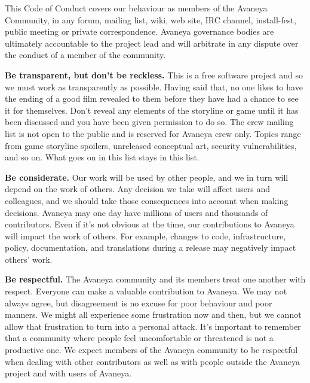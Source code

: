 
\blank
{}
\blank

This Code of Conduct covers our behaviour as members of the Avaneya Community, in any forum, mailing list, wiki, web site, IRC channel, install-fest, public meeting or private correspondence. Avaneya governance bodies are ultimately accountable to the project lead and will arbitrate in any dispute over the conduct of a member of the community.

\startitemize
\item
{\bf Be transparent, but don't be reckless.} This is a free software project and so we must work as transparently as possible. Having said that, no one likes to have the ending of a good film revealed to them before they have had a chance to see it for themselves. Don't reveal any elements of the storyline or game until it has been discussed and you have been given permission to do so. The crew mailing list is not open to the public and is reserved for Avaneya crew only. Topics range from game storyline spoilers, unreleased conceptual art, security vulnerabilities, and so on. What goes on in this list stays in this list.

\item
{\bf Be considerate.} Our work will be used by other people, and we in turn will depend on the work of others. Any decision we take will affect users and colleagues, and we should take those consequences into account when making decisions. Avaneya may one day have millions of users and thousands of contributors. Even if it's not obvious at the time, our contributions to Avaneya will impact the work of others. For example, changes to code, infrastructure, policy, documentation, and translations during a release may negatively impact others' work.

\item
{\bf Be respectful.} The Avaneya community and its members treat one another with respect. Everyone can make a valuable contribution to Avaneya. We may not always agree, but disagreement is no excuse for poor behaviour and poor manners. We might all experience some frustration now and then, but we cannot allow that frustration to turn into a personal attack. It's important to remember that a community where people feel uncomfortable or threatened is not a productive one. We expect members of the Avaneya community to be respectful when dealing with other contributors as well as with people outside the Avaneya project and with users of Avaneya.

